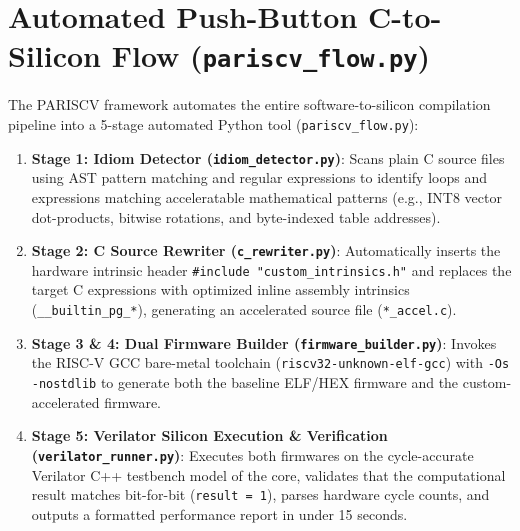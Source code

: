 \documentclass[11pt,a4paper]{article}
\begin{document}
\section{Automated Push-Button C-to-Silicon Flow (\texttt{pariscv\_flow.py})}

The PARISCV framework automates the entire software-to-silicon compilation pipeline into a 5-stage automated Python tool (\texttt{pariscv\_flow.py}):

\begin{enumerate}
    \item \textbf{Stage 1: Idiom Detector (\texttt{idiom\_detector.py})}: 
    Scans plain C source files using AST pattern matching and regular expressions to identify loops and expressions matching acceleratable mathematical patterns (e.g., INT8 vector dot-products, bitwise rotations, and byte-indexed table addresses).
    
    \item \textbf{Stage 2: C Source Rewriter (\texttt{c\_rewriter.py})}: 
    Automatically inserts the hardware intrinsic header \texttt{\#include "custom\_intrinsics.h"} and replaces the target C expressions with optimized inline assembly intrinsics (\texttt{\_\_builtin\_pg\_*}), generating an accelerated source file (\texttt{*\_accel.c}).
    
    \item \textbf{Stage 3 \& 4: Dual Firmware Builder (\texttt{firmware\_builder.py})}: 
    Invokes the RISC-V GCC bare-metal toolchain (\texttt{riscv32-unknown-elf-gcc}) with \texttt{-Os -nostdlib} to generate both the baseline ELF/HEX firmware and the custom-accelerated firmware.
    
    \item \textbf{Stage 5: Verilator Silicon Execution \& Verification (\texttt{verilator\_runner.py})}: 
    Executes both firmwares on the cycle-accurate Verilator C++ testbench model of the core, validates that the computational result matches bit-for-bit (\texttt{result = 1}), parses hardware cycle counts, and outputs a formatted performance report in under 15 seconds.
\end{enumerate}
\end{document}
